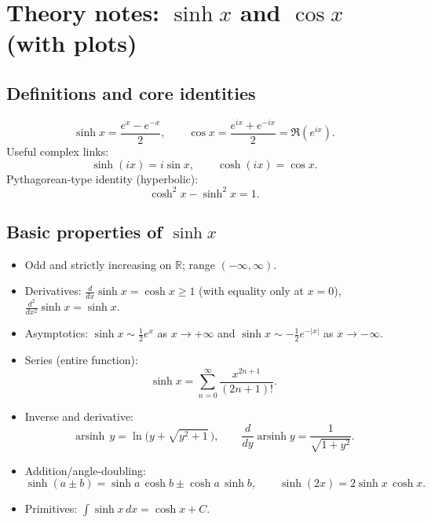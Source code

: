 \documentclass[11pt]{article}
\begin{document}
	\section*{Theory notes: $\sinh x$ and $\cos x$ (with plots)}
	
	\subsection*{Definitions and core identities}
	\[
	\sinh x=\frac{e^{x}-e^{-x}}{2}, \qquad 
	\cos x=\frac{e^{ix}+e^{-ix}}{2}=\Re\!\left(e^{ix}\right).
	\]
	Useful complex links:
	\[
	\sinh(ix)=i\sin x,\qquad \cosh(ix)=\cos x.
	\]
	Pythagorean-type identity (hyperbolic):
	\[
	\cosh^2 x-\sinh^2 x=1.
	\]
	
	\subsection*{Basic properties of $\sinh x$}
	\begin{itemize}
		\item Odd and strictly increasing on $\mathbb{R}$; range $(-\infty,\infty)$.
		\item Derivatives: $\displaystyle \frac{d}{dx}\sinh x=\cosh x\ge 1$ (with equality only at $x=0$), 
		$\displaystyle \frac{d^2}{dx^2}\sinh x=\sinh x$.
		\item Asymptotics: $\sinh x\sim \tfrac12 e^{x}$ as $x\to+\infty$ and $\sinh x\sim -\tfrac12 e^{-|x|}$ as $x\to-\infty$.
		\item Series (entire function):
		\[
		\sinh x=\sum_{n=0}^{\infty}\frac{x^{2n+1}}{(2n+1)!}.
		\]
		\item Inverse and derivative:
		\[
		\operatorname{arsinh}\,y=\ln\!\bigl(y+\sqrt{y^2+1}\,\bigr), 
		\qquad \frac{d}{dy}\operatorname{arsinh} y=\frac{1}{\sqrt{1+y^2}}.
		\]
		\item Addition/angle-doubling:
		\[
		\sinh(a\pm b)=\sinh a\,\cosh b\pm \cosh a\,\sinh b,\qquad 
		\sinh(2x)=2\sinh x\,\cosh x.
		\]
		\item Primitives: $\displaystyle \int \sinh x\,dx=\cosh x+C$.
	\end{itemize}
	
\end{document}
